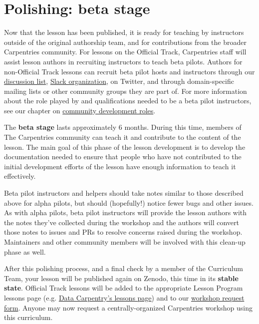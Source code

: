 \documentclass[]{book}
\begin{document}
\hypertarget{polishing-beta-stage}{%
\section{Polishing: beta stage}\label{polishing-beta-stage}}

Now that the lesson has been published, it is ready
for teaching by instructors outside of the original
authorship team, and for contributions from the broader
Carpentries community. For lessons on the Official Track,
Carpentries staff will assist lesson authors in recruiting instructors
to teach beta pilots. Authors for non-Official Track lessons
can recruit beta pilot hosts and instructors through our
\href{https://carpentries.topicbox.com/groups/discuss}{discussion list}, \href{https://swc-slack-invite.herokuapp.com/}{Slack organization},
on Twitter, and through domain-specific mailing lists
or other community groups they are part of.
For more information about the role played by
and qualifications needed to be a beta pilot instructors, see
our chapter on \href{https://cdh.carpentries.org/community-development-roles.html\#beta-pilot-instructors}{community development roles}.

The \textbf{beta stage} lasts approximately 6 months. During this time, members of
The Carpentries community can teach it and contribute to the content of the lesson.
The main goal of this phase of the lesson development is to develop the documentation
needed to ensure that people who have not contributed to the initial development
efforts of the lesson have enough information to teach it effectively.

Beta pilot instructors and helpers should take notes similar
to those described above for alpha pilots, but should (hopefully!)
notice fewer bugs and other issues. As with alpha pilots,
beta pilot instructors will provide the lesson authors with
the notes they've collected during the workshop and the authors
will convert those notes to issues and PRs to resolve concerns
raised during the workshop. Maintainers and other community members
will be involved with this clean-up phase as well.

After this polishing process, and a final check by a member of the
Curriculum Team, your lesson will be published again on Zenodo,
this time in its \textbf{stable state}. Official Track lessons will be added to
the appropriate Lesson Program lessons page (e.g. \href{https://datacarpentry.org/lessons/}{Data Carpentry's lessons page})
and to our \href{http://carpentries.org/request-workshop}{workshop request form}. Anyone may now request a centrally-organized
Carpentries workshop using this curriculum.
\end{document}
